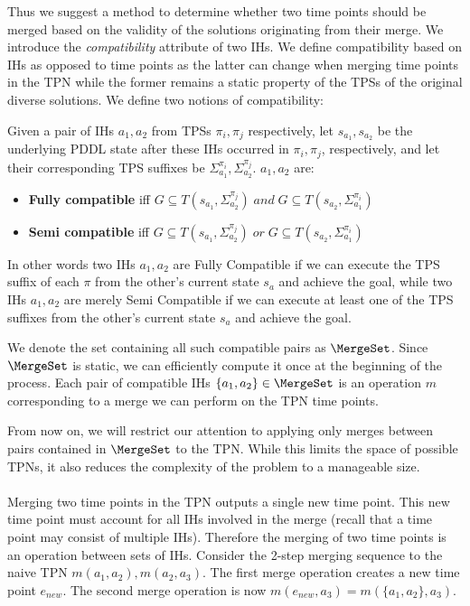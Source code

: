Thus we suggest a method to determine whether two time points should be merged based on the validity of the solutions originating from their merge.
We introduce the {\em compatibility} attribute of two IHs. We define compatibility based on IHs as opposed to time points as the latter can change when merging time points in the TPN while the former remains a static property of the TPSs of the original diverse solutions.
We define two notions of compatibility:
\begin{definition}
Given a pair of IHs $a_1,a_2$ from TPSs $\pi_i,\pi_j$ respectively, 
let $s_{a_1},s_{a_2}$ be 
the underlying PDDL state after these IHs occurred in $\pi_i,\pi_j$, respectively, and let their corresponding TPS suffixes be $\Sigma^{\pi_i}_{a_1}, \Sigma^{\pi_j}_{a_2}$.
$a_1,a_2$ are:
\begin{itemize}
    \item \textbf{Fully compatible} iff $G \subseteq T(s_{a_1},\Sigma^{\pi_j}_{a_2}) \; and \; G \subseteq T(s_{a_2},\Sigma^{\pi_i}_{a_1})$
    \item  \textbf{Semi compatible} iff $G \subseteq T(s_{a_1},\Sigma^{\pi_j}_{a_2}) \;  or \;  G \subseteq T(s_{a_2},\Sigma^{\pi_i}_{a_1})$
\end{itemize}
\end{definition}

In other words two IHs $a_1,a_2$ are Fully Compatible if we can execute the TPS suffix of each $\pi$ from the other's current state $s_a$ and achieve the goal, while two IHs $a_1,a_2$ are merely Semi Compatible if we can execute at least one of the TPS suffixes from the other's current state $s_a$ and achieve the goal.

We denote the set containing all such compatible pairs as $\MergeSet$. Since $\MergeSet$ is static, we can efficiently compute it once at the beginning of the process.
Each pair of compatible IHs $\{a_1,a_2\} \in \MergeSet$ is an operation $m$ corresponding to a merge we can perform on the TPN time points. 

From now on, we will restrict our attention to applying only merges between pairs contained in $\MergeSet$ to the TPN. While this limits the space of possible TPNs, it also reduces the complexity of the problem to a manageable size.
\\ \\  
Merging two time points in the TPN outputs a single new time point. This new time point must account for all IHs involved in the merge (recall that a time point may consist of multiple IHs). Therefore the merging of two time points is an operation between sets of IHs. Consider the 2-step merging sequence to the naive TPN $m(a_1,a_2),m(a_2,a_3)$. The first merge operation creates a new time point $e_{new}$. The second merge operation is now $m(e_{new},a_3)=m(\{a_1,a_2\},a_3)$.

